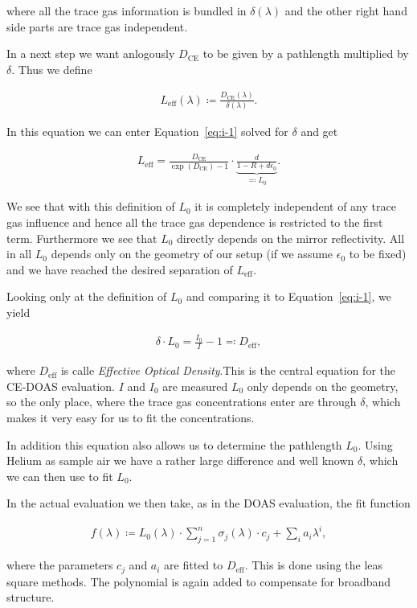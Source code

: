 where all the trace gas information is bundled in $\delta(\lambda)$
and the other right hand side parts are trace gas independent.

In a next step we want anlogously $D_{\text{CE}}$ to be given by a
pathlength multiplied by $\delta$. Thus we define

\begin{align}
  L_{\text{eff}}(\lambda) \coloneqq \frac{D_{\text{CE}}(\lambda)}{\delta(\lambda)}.
\end{align}

In this equation we can enter Equation~\ref{eq:i-1} solved for
$\delta$ and get

\begin{align}
  L_{\text{eff}} = \frac{D_{\text{CE}}}{\exp(D_{\text{CE}}) - 1} \cdot
  \underbrace{\frac{d}{1 - R + d\epsilon_0}}_{\eqqcolon L_0}.
\end{align}

We see that with this definition of $L_0$ it is completely independent
of any trace gas influence and hence all the trace gas dependence is
restricted to the first term. Furthermore we see that $L_0$ directly
depends on the mirror reflectivity. All in all $L_0$ depends only on
the geometry of our setup (if we assume $\epsilon_0$ to be fixed) and
we have reached the desired separation of $L_{\text{eff}}$.

Looking only at the definition of $L_0$ and comparing it to
Equation~\eqref{eq:i-1}, we yield

\begin{align}
  \delta \cdot L_0 = \frac{I_0}{I} - 1 \eqqcolon D_{\text{eff}}, \label{eq:ce-central}
\end{align}

where $D_{\text{eff}}$ is calle \emph{Effective Optical Density}.This
is the central equation for the CE-DOAS evaluation. $I$ and $I_0$ are
measured $L_0$ only depends on the geometry, so the only place, where
the trace gas concentrations enter are through $\delta$, which makes
it very easy for us to fit the concentrations.

In addition this equation also allows us to determine the pathlength
$L_0$. Using Helium as sample air we have a rather large difference
and well known $\delta$, which we can then use to fit
$L_0$.

In the actual evaluation we then take, as in the DOAS evaluation, the fit function

\begin{align*}
  f(\lambda) \coloneqq L_0(\lambda)\cdot\sum_{j=1}^n \sigma_j(\lambda)
  \cdot c_j + \sum_i a_i \lambda^i,
\end{align*}

where the parameters $c_j$ and $a_i$ are fitted to
$D_{\text{eff}}$. This is done using the leas square methods. The
polynomial is again added to compensate for broadband structure.

